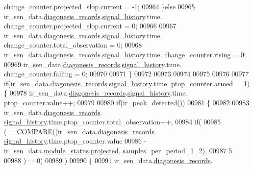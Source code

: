 \begin{DoxyCode}
{{      change\_counter.projected\_slop.current = -1;
00964              \}\textcolor{keywordflow}{else}
00965               ir\_sen\_data.\hyperlink{a00023_a7ae905b560513ad201e58c2f63375030}{diagonesis\_records}.\hyperlink{a00017_affb63906d23cb1cb7787d61eaaedfb60}{signal\_history}.time.
      change\_counter.projected\_slop.current = 0;
00966 
00967                  ir\_sen\_data.\hyperlink{a00023_a7ae905b560513ad201e58c2f63375030}{diagonesis\_records}.\hyperlink{a00017_affb63906d23cb1cb7787d61eaaedfb60}{signal\_history}.time.
      change\_counter.total\_observation = 0;
00968                  ir\_sen\_data.\hyperlink{a00023_a7ae905b560513ad201e58c2f63375030}{diagonesis\_records}.\hyperlink{a00017_affb63906d23cb1cb7787d61eaaedfb60}{signal\_history}.time.
      change\_counter.rising            = 0;
00969                  ir\_sen\_data.\hyperlink{a00023_a7ae905b560513ad201e58c2f63375030}{diagonesis\_records}.\hyperlink{a00017_affb63906d23cb1cb7787d61eaaedfb60}{signal\_history}.time.
      change\_counter.falling           = 0;
00970 
00971            \}
00972 
00973 
00974 
00975 
00976 
00977           \textcolor{keywordflow}{if}(ir\_sen\_data.\hyperlink{a00023_a7ae905b560513ad201e58c2f63375030}{diagonesis\_records}.\hyperlink{a00017_affb63906d23cb1cb7787d61eaaedfb60}{signal\_history}.time.
      ptop\_counter.armed==1)\{
00978                ir\_sen\_data.\hyperlink{a00023_a7ae905b560513ad201e58c2f63375030}{diagonesis\_records}.\hyperlink{a00017_affb63906d23cb1cb7787d61eaaedfb60}{signal\_history}.time.
      ptop\_counter.value++;
00979 
00980                \textcolor{keywordflow}{if}(ir\_peak\_detected())
00981                 \{
00982 
00983                    ir\_sen\_data.\hyperlink{a00023_a7ae905b560513ad201e58c2f63375030}{diagonesis\_records}.
      \hyperlink{a00017_affb63906d23cb1cb7787d61eaaedfb60}{signal\_history}.time.ptop\_counter.total\_observation++;
00984                    \textcolor{keywordflow}{if}(
00985                       (\hyperlink{a00021_a1aaf79017d1250538fff385827b7401e}{\_\_COMPARE}((ir\_sen\_data.\hyperlink{a00023_a7ae905b560513ad201e58c2f63375030}{diagonesis\_records}.
      \hyperlink{a00017_affb63906d23cb1cb7787d61eaaedfb60}{signal\_history}.time.ptop\_counter.value
00986                            -ir\_sen\_data.\hyperlink{a00023_a5a53c391562b059eb744ac679f3765ca}{module\_status}.\hyperlink{a00017_a6b2516d74583418cec324c50041421c9}{projected}.
      samples\_per\_period\_1\_2),
00987                            5
00988                       )==0)
00989                    )
00990                    \{
00991                        ir\_sen\_data.\hyperlink{a00023_a7ae905b560513ad201e58c2f63375030}{diagonesis\_records}.
}}
\end{DoxyCode}
